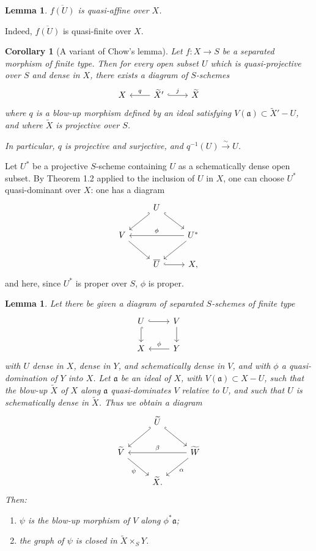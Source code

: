 \documentclass[11pt,a4paper]{article}
\theoremstyle{plain}
\newtheorem{lemma}[theorem]{Lemma}
\newtheorem{corollary}[theorem]{Corollary}
\theoremstyle{definition}
\begin{document}
\begin{lemma}
$\overline{f(U)}$ is quasi-affine over $X$.
\end{lemma}

Indeed, $\overline{f(U)}$ is quasi-finite over $X$.

\begin{corollary}[A variant of Chow's lemma]
Let $f:X\to S$ be a separated morphism of finite type. Then for every open subset $U$ which is quasi-projective over $S$ and dense in $X$, there exists a diagram of $S$-schemes
\[
\begin{tikzcd}
X & \widetilde X' \arrow[l,"q"'] \arrow[r,hook,"j"] & \widetilde X
\end{tikzcd}
\]
where $q$ is a blow-up morphism defined by an ideal satisfying $V(\mathfrak a)\subset \widetilde X'-U$, and where $\widetilde X$ is projective over $S$.

In particular, $q$ is projective and surjective, and $q^{-1}(U)\xrightarrow{\sim}U$.
\end{corollary}

Let $U^*$ be a projective $S$-scheme containing $U$ as a schematically dense open subset. By Theorem 1.2 applied to the inclusion of $U$ in $X$, one can choose $U^*$ quasi-dominant over $X$: one has a diagram
\begin{equation}\label{eq:1.4.1}
\begin{tikzcd}
& U \arrow[dl,hook'] \arrow[dr,hook] \\
V \arrow[dr] && U^* \arrow[ll,"\phi"'] \arrow[dl] \\
& \overline U \arrow[r,hook] & X,
\end{tikzcd}
\end{equation}
and here, since $U^*$ is proper over $S$, $\phi$ is proper.

\begin{lemma}
Let there be given a diagram of separated $S$-schemes of finite type
\[
\begin{tikzcd}
U \arrow[d,hook] \arrow[r,hook] & V \arrow[d] \\
X & Y \arrow[l,"\phi"']
\end{tikzcd}
\]
with $U$ dense in $X$, dense in $Y$, and schematically dense in $V$, and with $\phi$ a quasi-domination of $Y$ into $X$. Let $\mathfrak a$ be an ideal of $X$, with $V(\mathfrak a)\subset X-U$, such that the blow-up $\widetilde X$ of $X$ along $\mathfrak a$ quasi-dominates $V$ relative to $U$, and such that $U$ is schematically dense in $\widetilde X$. Thus we obtain a diagram
\[
\begin{tikzcd}
& \widetilde U \arrow[dl,hook'] \arrow[dr,hook] \\
\widetilde V \arrow[dr,"\psi"'] && \widetilde W \arrow[ll,"\beta"'] \arrow[dl,"\alpha"] \\
& \widetilde X .
\end{tikzcd}
\]
Then:
\begin{enumerate}[label=(\alph*)]
\item $\psi$ is the blow-up morphism of $V$ along $\phi^*\mathfrak a$;
\item the graph of $\psi$ is closed in $\widetilde X\times_S Y$.
\end{enumerate}
\end{lemma}
\end{document}
